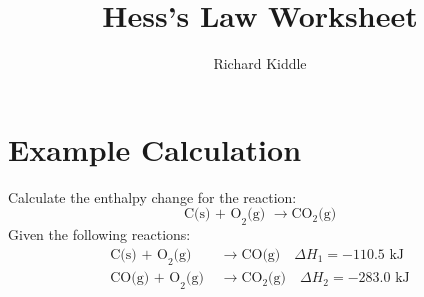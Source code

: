 \documentclass{article}
\title{Hess's Law Worksheet}
\date{}
\author{Richard Kiddle}
\begin{document}
\maketitle




\section*{Example Calculation}
Calculate the enthalpy change for the reaction:
\[
\text{C(s) + O}_2\text{(g) } \rightarrow \text{CO}_2\text{(g)}
\]
Given the following reactions:
\begin{align*}
\text{C(s) + O}_2\text{(g) } &\rightarrow \text{CO(g)} \quad \Delta H_1 = -110.5 \text{ kJ} \\
\text{CO(g) + O}_2\text{(g) } &\rightarrow \text{CO}_2\text{(g)} \quad \Delta H_2 = -283.0 \text{ kJ}
\end{align*}
\end{document}
